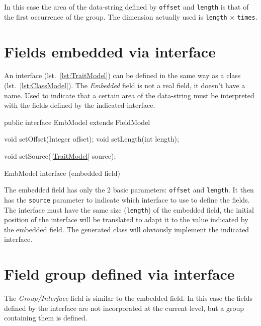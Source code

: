 \documentclass[a4paper,10pt]{report}
\newenvironment{elisting}[1][H]
  {\captionsetup{aboveskip=0pt}\begin{listing}[#1]}
  {\end{listing}%
}
\begin{document}
In this case the area of the data-string defined by \verb!offset! and 
\verb!length! is that of the first occurrence of the group. 
The dimension actually used is \verb!length! $\times$ \verb!times!.

\section{Fields embedded via interface}
An interface (lst.~\ref{lst:TraitModel}) can be defined in the same way as a 
class (lst.~\ref{lst:ClassModel}). 
The \textsl{Embedded} field is not a real field, it doesn't have a name. 
Used to indicate that a certain area of the data-string must be interpreted with 
the fields defined by the indicated interface.

\begin{elisting}[!htb]
\begin{javacode}
public interface EmbModel extends FieldModel {
    void setOffset(Integer offset);
    void setLength(int length);
    
    void setSource(|\hyperref[lst:TraitModel]{TraitModel}| source);
}
\end{javacode}
\caption{EmbModel interface (embedded field)}
\label{lst:EmbModel}
\end{elisting}

The embedded field has only the 2 basic parameters: \verb!offset! and 
\verb!length!. 
It then has the \verb!source! parameter to indicate which interface to use to 
define the fields. The interface must have the same size (\verb!length!) of the 
embedded field, the initial position of the interface will be translated to 
adapt it to the value indicated by the embedded field. 
The generated class will obviously implement the indicated interface.

\section{Field group defined via interface} 
The \textsl{Group/Interface} field is similar to the embedded field. 
In this case the fields defined by the interface are not incorporated at the 
current level, but a group containing them is defined.
\end{document}

